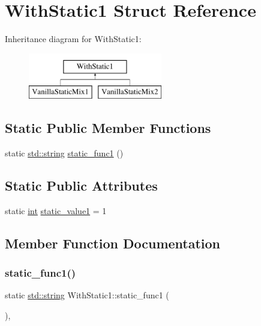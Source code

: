 \hypertarget{struct_with_static1}{}\section{With\+Static1 Struct Reference}
\label{struct_with_static1}
Inheritance diagram for With\+Static1\+:\begin{figure}[H]
\begin{center}
\leavevmode
\includegraphics[height=2.000000cm]{struct_with_static1}
\end{center}
\end{figure}
\subsection*{Static Public Member Functions}
\begin{DoxyCompactItemize}
\item 
static \mbox{\hyperlink{_s_d_l__opengl__glext_8h_ab4ccfaa8ab0e1afaae94dc96ef52dde1}{std\+::string}} \mbox{\hyperlink{struct_with_static1_a7ef06497ece83136cc31e0c19efb8b04}{static\+\_\+func1}} ()
\end{DoxyCompactItemize}
\subsection*{Static Public Attributes}
\begin{DoxyCompactItemize}
\item 
static \mbox{\hyperlink{warnings_8h_a74f207b5aa4ba51c3a2ad59b219a423b}{int}} \mbox{\hyperlink{struct_with_static1_a5f2091146c7d5026d1f6f4df3748cea8}{static\+\_\+value1}} = 1
\end{DoxyCompactItemize}


\subsection{Member Function Documentation}
\mbox{\label{struct_with_static1_a7ef06497ece83136cc31e0c19efb8b04}} 
\subsubsection{\texorpdfstring{static\_func1()}{static\_func1()}}
{\footnotesize\ttfamily static \mbox{\hyperlink{_s_d_l__opengl__glext_8h_ab4ccfaa8ab0e1afaae94dc96ef52dde1}{std\+::string}} With\+Static1\+::static\+\_\+func1 (\begin{DoxyParamCaption}{ }\end{DoxyParamCaption})\hspace{0.3cm}{\ttfamily [inline]}, {\ttfamily [static]}}



